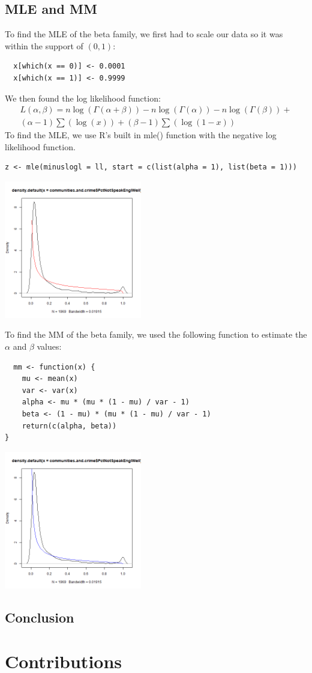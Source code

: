 \documentclass[12pt, letterpaper]{report}
\begin{document}
\section{MLE and MM}
To find the MLE of the beta family, we first had to scale our data so it was within the support of $(0, 1)$: 
\begin{lstlisting}
  x[which(x == 0)] <- 0.0001  
  x[which(x == 1)] <- 0.9999
\end{lstlisting} 
We then found the log likelihood function:
\begin{multline}
L(\alpha, \beta) = n \log{(\Gamma(\alpha+\beta))} - n \log{(\Gamma(\alpha))} - n \log{(\Gamma(\beta))} + \\
(\alpha - 1) \sum(\log(x)) + (\beta-1) \sum(\log{(1-x)})
\end{multline}
To find the MLE, we use R's built in mle() function with the negative log likelihood function. 
\begin{lstlisting}
z <- mle(minuslogl = ll, start = c(list(alpha = 1), list(beta = 1)))
\end{lstlisting} 

\begin{center}
\includegraphics[width=0.45\textwidth]{beta/PctNotSpeakEnglWell_mle}
\end{center}

To find the MM of the beta family, we used the following function to estimate the $\alpha$ and $\beta$ values:
\begin{lstlisting}
  mm <- function(x) {
    mu <- mean(x)
    var <- var(x)
    alpha <- mu * (mu * (1 - mu) / var - 1)
    beta <- (1 - mu) * (mu * (1 - mu) / var - 1)
    return(c(alpha, beta))
}
\end{lstlisting} 

\begin{center}
\includegraphics[width=0.45\textwidth]{beta/PctNotSpeakEnglWell_mm}
\end{center}

\section{Conclusion}

\chapter{Contributions}
\end{document}
